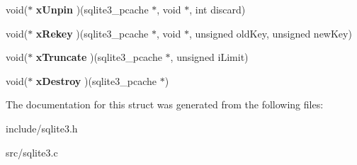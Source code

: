 \begin{DoxyCompactItemize}
\item 
\hypertarget{structsqlite3__pcache__methods_ade2ab50cc6896be03ee86541877fa85e}{void($\ast$ {\bfseries x\-Unpin} )(sqlite3\-\_\-pcache $\ast$, void $\ast$, int discard)}\label{structsqlite3__pcache__methods_ade2ab50cc6896be03ee86541877fa85e}

\item 
\hypertarget{structsqlite3__pcache__methods_adc5552190f1de86eb95d91e9cf8430e6}{void($\ast$ {\bfseries x\-Rekey} )(sqlite3\-\_\-pcache $\ast$, void $\ast$, unsigned old\-Key, unsigned new\-Key)}\label{structsqlite3__pcache__methods_adc5552190f1de86eb95d91e9cf8430e6}

\item 
\hypertarget{structsqlite3__pcache__methods_aad73f9335999770bcd2dc6a2d914b4f0}{void($\ast$ {\bfseries x\-Truncate} )(sqlite3\-\_\-pcache $\ast$, unsigned i\-Limit)}\label{structsqlite3__pcache__methods_aad73f9335999770bcd2dc6a2d914b4f0}

\item 
\hypertarget{structsqlite3__pcache__methods_aac18fc581d8d63550a6657016c24ba5d}{void($\ast$ {\bfseries x\-Destroy} )(sqlite3\-\_\-pcache $\ast$)}\label{structsqlite3__pcache__methods_aac18fc581d8d63550a6657016c24ba5d}

\end{DoxyCompactItemize}


The documentation for this struct was generated from the following files\-:\begin{DoxyCompactItemize}
\item 
include/sqlite3.\-h\item 
src/sqlite3.\-c\end{DoxyCompactItemize}

